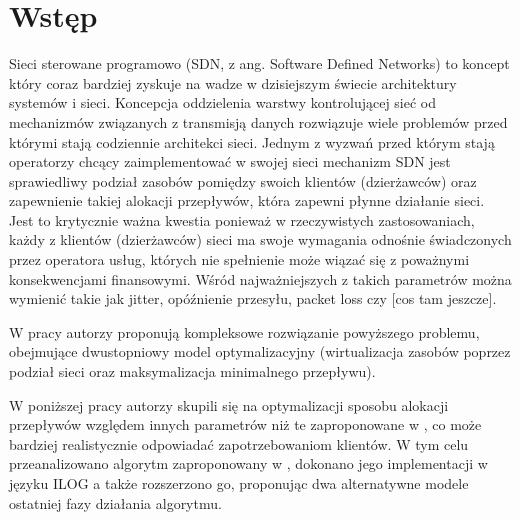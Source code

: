 \section{Wstęp}

Sieci sterowane programowo (SDN, z ang. Software Defined Networks) to koncept który coraz bardziej zyskuje na wadze w dzisiejszym świecie architektury systemów i sieci. Koncepcja oddzielenia warstwy kontrolującej sieć od mechanizmów związanych z transmisją danych rozwiązuje wiele problemów przed którymi stają codziennie architekci sieci. Jednym z wyzwań przed którym stają operatorzy chcący zaimplementować w swojej sieci mechanizm SDN jest sprawiedliwy podział zasobów pomiędzy swoich klientów (dzierżawców) oraz zapewnienie takiej alokacji przepływów, która zapewni płynne działanie sieci. Jest to krytycznie ważna kwestia ponieważ w rzeczywistych zastosowaniach, każdy z klientów (dzierżawców) sieci ma swoje wymagania odnośnie świadczonych przez operatora usług, których nie spełnienie może wiązać się z poważnymi konsekwencjami finansowymi. Wśród najważniejszych z takich parametrów można wymienić takie jak jitter, opóźnienie przesyłu, packet loss czy [cos tam jeszcze]. \newline

\noindent W pracy \cite{lin16} autorzy proponują kompleksowe rozwiązanie powyższego problemu, obejmujące dwustopniowy model optymalizacyjny (wirtualizacja zasobów poprzez podział sieci oraz maksymalizacja minimalnego przepływu).  \newline

\noindent W poniższej pracy autorzy skupili się na optymalizacji sposobu alokacji przepływów względem innych parametrów niż te zaproponowane w \cite{lin16}, co może bardziej realistycznie odpowiadać zapotrzebowaniom klientów. W tym celu przeanalizowano algorytm zaproponowany w \cite{lin16}, dokonano jego implementacji w języku ILOG a także rozszerzono go, proponując dwa alternatywne modele ostatniej fazy działania algorytmu.
